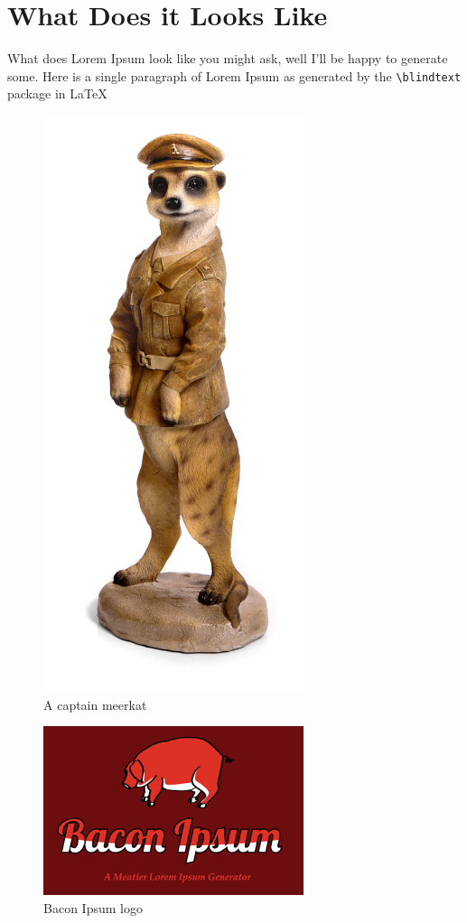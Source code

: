 \documentclass[11pt]{article}
\begin{document}
\section{What Does it Looks Like}
What does Lorem Ipsum look like you might ask, well I'll be happy to generate some.
Here is a single paragraph of Lorem Ipsum as generated by the \verb=\blindtext= package in \LaTeX\ \\
\indent
\blindtext
\begin{figure}
\begin{center}
\includegraphics[width=3in, scale=0.5]{captainmeerkat.jpeg}
\end{center}
\caption{A captain meerkat~\cite{meerkat}}
\label{fig:meerkat}
\end{figure}

\begin{figure}
\begin{center}
\includegraphics[width=3in, scale=0.5]{bacon_ipsum.png}
\end{center}
\caption{Bacon Ipsum logo~\cite{bacon}}
\label{fig:bacon}
\end{figure}
\end{document}
